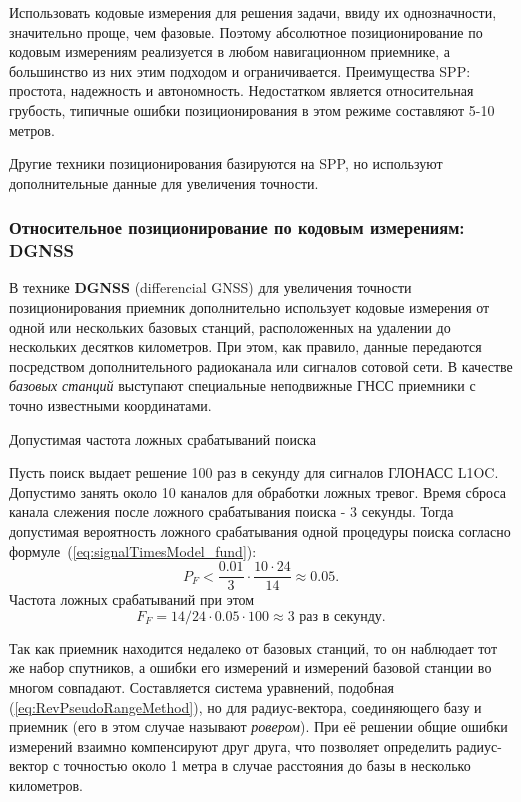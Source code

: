 Использовать кодовые измерения для решения задачи, ввиду их однозначности, значительно проще, чем фазовые. 
Поэтому абсолютное позиционирование по кодовым измерениям реализуется в любом навигационном приемнике, а большинство из них этим подходом и ограничивается. 
Преимущества SPP: простота, надежность и автономность. 
Недостатком является относительная грубость, типичные ошибки позиционирования в этом режиме составляют 5-10 метров. 

Другие техники позиционирования базируются на SPP, но используют дополнительные данные для увеличения точности. 

\subsubsection{Относительное позиционирование по кодовым измерениям: DGNSS}

В технике \textbf{DGNSS} (differencial GNSS) для увеличения точности позиционирования приемник дополнительно использует кодовые измерения от одной или нескольких базовых станций, расположенных на удалении до нескольких десятков километров.
При этом, как правило, данные передаются посредством дополнительного радиоканала или сигналов сотовой сети. 
В качестве \textit{базовых станций} выступают специальные неподвижные ГНСС приемники с точно известными координатами. 

\begin{example}[H]\caption{Допустимая частота ложных срабатываний поиска}
\setlength{\parindent}{12mm}
\label{ex:okSearchPf}
\vspace{2mm}
{\footnotesize

Пусть поиск выдает решение 100 раз в секунду для сигналов ГЛОНАСС L1OC.
Допустимо занять около 10 каналов для обработки ложных тревог.
Время сброса канала слежения после ложного срабатывания поиска - 3 секунды.
Тогда допустимая вероятность ложного срабатывания одной процедуры поиска согласно формуле~(\ref{eq:signalTimesModel_fund}):
\[
P_F < \frac{0.01}{3} \cdot \frac{10 \cdot 24}{14} \approx 0.05.
\]
Частота ложных срабатываний при этом
\[
F_F = 14/24 \cdot 0.05 \cdot 100 \approx 3  \text{ раз в секунду}.
\]

}
\end{example}

Так как приемник находится недалеко от базовых станций, то он наблюдает тот же набор спутников, а ошибки его измерений и измерений базовой станции во многом совпадают. 
Составляется система уравнений, подобная (\ref{eq:RevPseudoRangeMethod}), но для радиус-вектора, соединяющего базу и приемник (его в этом случае называют \textit{ровером}).
При её решении общие ошибки измерений взаимно компенсируют друг друга, что позволяет определить радиус-вектор с точностью около 1 метра в случае расстояния до базы в несколько километров. 

